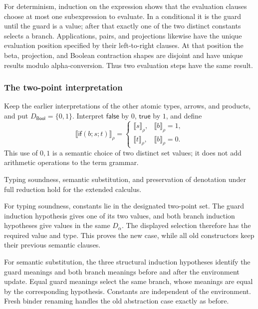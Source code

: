 For determinism, induction on the expression shows that the evaluation
clauses choose at most one subexpression to evaluate. In a conditional
it is the guard until the guard is a value; after that exactly one of
the two distinct constants selects a branch. Applications, pairs, and
projections likewise have the unique evaluation position specified by
their left-to-right clauses. At that position the beta, projection, and
Boolean contraction shapes are disjoint and have unique results modulo
alpha-conversion. Thus two evaluation steps have the same result.
\Done

\subsubsection{The two-point interpretation}
Keep the earlier interpretations of the other atomic types, arrows,
and products, and put $D_{\mathsf{Bool}}=\{0,1\}$. Interpret
$\mathsf{false}$ by $0$, $\mathsf{true}$ by $1$, and define
\[
\llbracket\mathsf{if}(b;s;t)\rrbracket_\rho=
\begin{cases}
\llbracket s\rrbracket_\rho,&\llbracket b\rrbracket_\rho=1,\\
\llbracket t\rrbracket_\rho,&\llbracket b\rrbracket_\rho=0.
\end{cases}
\]
This use of $0,1$ is a semantic choice of two distinct set values;
it does not add arithmetic operations to the term grammar.

\begin{proposition}
Typing soundness, semantic substitution, and preservation of denotation
under full reduction hold for the extended calculus.
\end{proposition}
\Proof
For typing soundness, constants lie in the designated two-point set.
The guard induction hypothesis gives one of its two values, and both
branch induction hypotheses give values in the same $D_\alpha$.
The displayed selection therefore has the required value and type.
This proves the new case, while all old constructors keep their
previous semantic clauses.

For semantic substitution, the three structural induction hypotheses
identify the guard meanings and both branch meanings before and after
the environment update. Equal guard meanings select the same branch,
whose meanings are equal by the corresponding hypothesis. Constants
are independent of the environment. Fresh binder renaming handles the
old abstraction case exactly as before.

